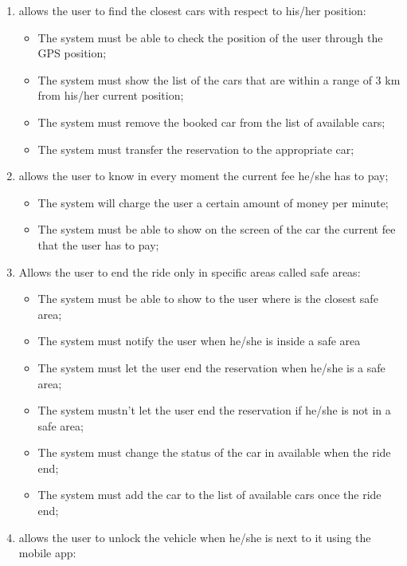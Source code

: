 \begin{enumerate}
\item allows the user to find the closest cars with respect to his/her position:

\begin{itemize}
\item The system must be able to check the position of the user through the GPS position;
\item The system must show the list of the cars that are within a range of 3 km from his/her current position;
\item The system must remove the booked car from the list of available cars;
\item The system must transfer the reservation to the appropriate car;
\end{itemize}

\item allows the user to know in every moment the current fee he/she has to pay;

\begin{itemize}
\item The system will charge the user a certain amount of money per minute;
\item The system must be able to show on the screen of the car the current fee that the user has to pay;
\end{itemize}

\item Allows the user to end the ride only in specific areas called safe areas:

\begin{itemize}
\item The system must be able to show to the user where is the closest safe area;
\item The system must notify the user when he/she is inside a safe area
\item The system must let the user end the reservation when he/she is a safe area;
\item The system mustn't let the user end the reservation if he/she is not in a safe area;
\item The system must change the status of the car in available when the ride end;
\item The system must add the car to the list of available cars once the ride end;
\end{itemize}

\item allows the user to unlock the vehicle when he/she is next to it using the mobile app:


\end{enumerate}
